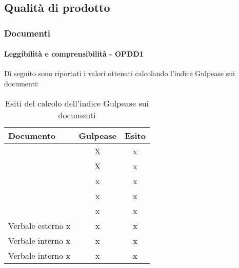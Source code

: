 \documentclass[PdQ.tex]{subfiles}
\begin{document}
\newpage		
\subsection{Qualità di prodotto}
	\subsubsection{Documenti}
		\paragraph{Leggibilità e comprensibilità - OPDD1}
				Di seguito sono riportati i valori ottenuti calcolando l'indice Gulpease sui documenti:
				\begin{table}[h]
				\centering
				\begin{tabular}{l c c}
					\hline
					\rule[-0.3cm]{0cm}{0.8cm}
					\textbf{Documento} & \textbf{Gulpease} & \textbf{Esito} \\
					\hline
					\rule[0cm]{0cm}{0.4cm}
					\PPdocRP & X & x \\
					\rule[0cm]{0cm}{0.4cm}
					\NPdocRP & X & x \\ 
					\rule[0cm]{0cm}{0.4cm}
					\ARdocRP & x & x \\ 
					\rule[0cm]{0cm}{0.4cm}
					\PQdocRP & x & x \\ 
					\rule[0cm]{0cm}{0.4cm}
					\Gldoc & x & x\\ 
					\rule[0cm]{0cm}{0.4cm}
					Verbale esterno x & x & x\\ 
					\rule[0cm]{0cm}{0.4cm}
					Verbale interno x & x & x\\ 
					\rule[0cm]{0cm}{0.4cm}
					Verbale interno x & x & x\\ 
					
					\hline
				\end{tabular}
				\caption{Esiti del calcolo dell'indice Gulpease sui documenti}
			\end{table}		
\end{document}
